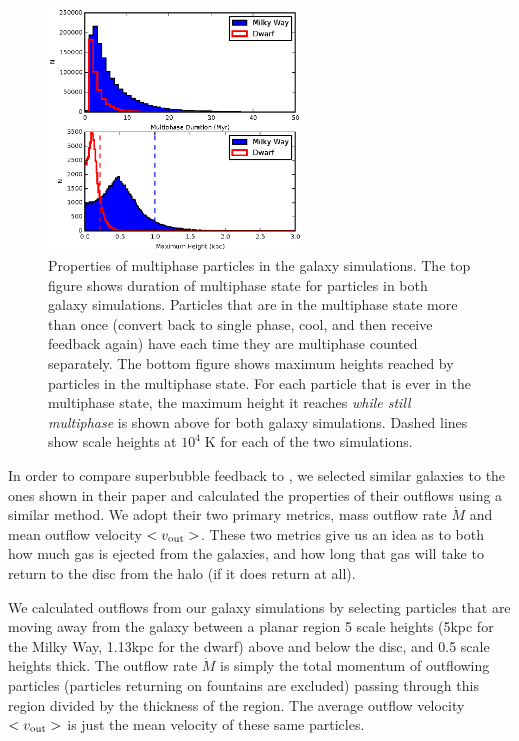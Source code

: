 \begin{figure}
    \includegraphics[width=0.6\textwidth]{figures1/multiphase_properties.eps}
    \caption[Properties of multiphase particles]{Properties of multiphase
    particles in the galaxy simulations.  The top figure shows duration of
    multiphase state for particles in both galaxy simulations.  Particles that
    are in the multiphase state more than once (convert back to single phase,
    cool, and then receive feedback again) have each time they are multiphase
    counted separately. The bottom figure shows maximum heights reached by
    particles in the multiphase state.  For each particle that is ever in the
    multiphase state, the maximum height it reaches {\it while still multiphase}
    is shown above for both galaxy simulations.  Dashed lines show scale heights
    at $10^4\;\mathrm{K}$ for each of the two simulations.}
    \label{multiphase_properties}
\end{figure}
In order to compare superbubble feedback to \citet{DallaVecchia2012}, we selected
similar galaxies to the ones shown in their paper and calculated the properties
of their outflows using a similar method.  We adopt their two primary metrics,
mass outflow rate $\dot M$ and mean outflow velocity $<v_{\rm out}>$.  These two
metrics give us an idea as to both how much gas is ejected from the galaxies,
and how long that gas will take to return to the disc from the halo (if it does
return at all).

We calculated outflows from our galaxy simulations by selecting particles that
are moving away from the galaxy between a planar region 5 scale heights (5kpc
for the Milky Way, 1.13kpc for the dwarf) above and below the disc, and 0.5
scale heights thick.  The outflow rate $\dot M$ is simply the total momentum of
outflowing particles (particles returning on fountains are excluded) passing
through this region divided by the thickness of the region.  The average outflow
velocity $<v_{\rm out}>$ is just the mean velocity of these same particles.

